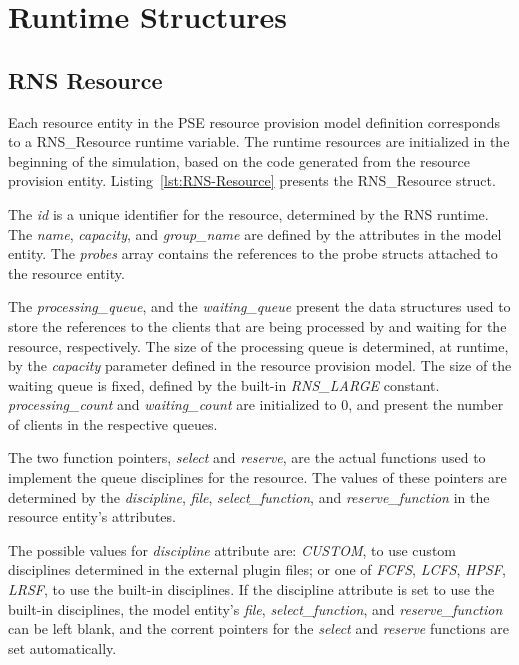 \section{Runtime Structures}
\subsection{RNS Resource}
Each resource entity in the PSE resource provision model definition corresponds to a RNS\_Resource runtime variable. The runtime resources are initialized in the beginning of the simulation, based on the code generated from the resource provision entity. Listing~\ref{lst:RNS-Resource} presents the RNS\_Resource struct.



The \emph{id} is a unique identifier for the resource, determined by the RNS runtime. The \emph{name}, \emph{capacity}, and \emph{group\_name} are defined by the attributes in the model entity. The \emph{probes} array contains the references to the probe structs attached to the resource entity.

The \emph{processing\_queue}, and the \emph{waiting\_queue} present the data structures used to store the references to the clients that are being processed by and waiting for the resource, respectively. The size of the processing queue is determined, at runtime, by the \emph{capacity} parameter defined in the resource provision model. The size of the waiting queue is fixed, defined by the built-in \emph{RNS\_LARGE} constant. \emph{processing\_count} and \emph{waiting\_count} are initialized to 0, and present the number of clients in the respective queues.

The two function pointers, \emph{select} and \emph{reserve}, are the actual functions used to implement the queue disciplines for the resource. The values of these pointers are determined by the \emph{discipline}, \emph{file}, \emph{select\_function}, and \emph{reserve\_function} in the resource entity's attributes.

The possible values for \emph{discipline} attribute are: \emph{CUSTOM}, to use custom disciplines determined in the external plugin files; or one of \emph{FCFS}, \emph{LCFS}, \emph{HPSF}, \emph{LRSF}, to use the built-in disciplines. If the discipline attribute is set to use the built-in disciplines, the model entity's \emph{file}, \emph{select\_function}, and \emph{reserve\_function} can be left blank, and the corrent pointers for the \emph{select} and \emph{reserve} functions are set automatically.

